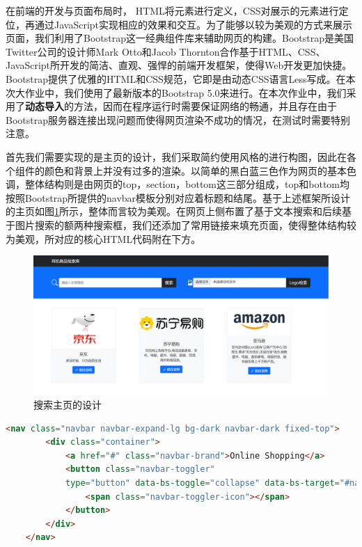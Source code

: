 \documentclass[a4paper,12pt]{article}
\begin{document}
    在前端的开发与页面布局时， HTML将元素进行定义，CSS对展示的元素进行定位，再通过JavaScript实现相应的效果和交互。为了能够以较为美观的方式来展示页面，我们利用了Bootstrap这一经典组件库来辅助网页的构建。Bootstrap是美国Twitter公司的设计师Mark Otto和Jacob Thornton合作基于HTML、CSS、JavaScript所开发的简洁、直观、强悍的前端开发框架，使得Web开发更加快捷。Bootstrap提供了优雅的HTML和CSS规范，它即是由动态CSS语言Less写成。在本次大作业中，我们使用了最新版本的Bootstrap 5.0来进行。在本次作业中，我们采用了\textbf{动态导入}的方法，因而在程序运行时需要保证网络的畅通，并且存在由于Bootstrap服务器连接出现问题而使得网页渲染不成功的情况，在测试时需要特别注意。

    首先我们需要实现的是主页的设计，我们采取简约使用风格的进行构图，因此在各个组件的颜色和背景上并没有过多的渲染。以简单的黑白蓝三色作为网页的基本色调，整体结构则是由网页的top，section，bottom这三部分组成，top和bottom均按照Bootstrap所提供的navbar模板分别对应着标题和结尾。基于上述框架所设计的主页如图\ref{fig:13}所示，整体而言较为美观。在网页上侧布置了基于文本搜索和后续基于图片搜索的额两种搜索框，我们还添加了常用链接来填充页面，使得整体结构较为美观，所对应的核心HTML代码附在下方。

    \begin{figure}[H]
        \centering
        \includegraphics[scale=0.4]{pic/pic13.png}
        \caption{搜索主页的设计}
        \label{fig:13}
    \end{figure}

    \begin{lstlisting}[language=html]
    <nav class="navbar navbar-expand-lg bg-dark navbar-dark fixed-top">
        <div class="container">
            <a href="#" class="navbar-brand">Online Shopping</a>
            <button class="navbar-toggler" 
            type="button" data-bs-toggle="collapse" data-bs-target="#navmenu">
                <span class="navbar-toggler-icon"></span>
            </button>
        </div>
    </nav>
    \end{lstlisting}
\end{document}
